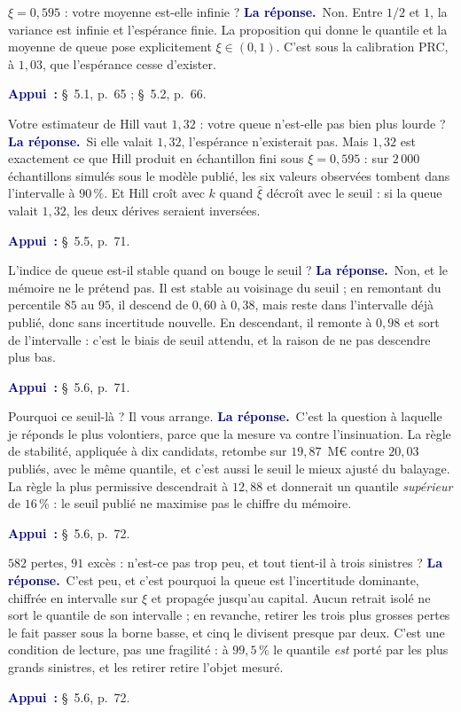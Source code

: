 \documentclass[11pt,a4paper]{article}
\newcommand{\rep}[1]{\smallskip\noindent\textcolor{navy}{\textbf{La réponse.}}\ #1\par}
\newcommand{\appui}[1]{\smallskip\noindent\small\textcolor{navy}{\textbf{Appui~:}} #1\par\normalsize}
\begin{document}
\begin{question}{\og $\xi=0{,}595$ : votre moyenne est-elle infinie ?\fg{}}
\rep{Non. Entre $1/2$ et $1$, la variance est infinie et l'espérance finie. La proposition qui
donne le quantile et la moyenne de queue pose explicitement $\xi\in(0,1)$. C'est sous la
calibration PRC, à $1{,}03$, que l'espérance cesse d'exister.}
\appui{\S~5.1, p.~65 ; \S~5.2, p.~66.}
\end{question}

\begin{question}{\og Votre estimateur de Hill vaut $1{,}32$ : votre queue n'est-elle pas bien plus lourde ?\fg{}}
\rep{Si elle valait $1{,}32$, l'espérance n'existerait pas. Mais $1{,}32$ est exactement ce que Hill
produit en échantillon fini sous $\xi=0{,}595$ : sur $2\,000$ échantillons simulés sous le modèle
publié, les six valeurs observées tombent dans l'intervalle à $90\,\%$. Et Hill croît avec $k$
quand $\hat\xi$ décroît avec le seuil : si la queue valait $1{,}32$, les deux dérives seraient
inversées.}
\appui{\S~5.5, p.~71.}
\end{question}

\begin{question}{\og L'indice de queue est-il stable quand on bouge le seuil ?\fg{}}
\rep{Non, et le mémoire ne le prétend pas. Il est stable au voisinage du seuil ; en remontant du
percentile $85$ au $95$, il descend de $0{,}60$ à $0{,}38$, mais reste dans l'intervalle déjà
publié, donc sans incertitude nouvelle. En descendant, il remonte à $0{,}98$ et sort de
l'intervalle : c'est le biais de seuil attendu, et la raison de ne pas descendre plus bas.}
\appui{\S~5.6, p.~71.}
\end{question}

\begin{question}{\og Pourquoi ce seuil-là ? Il vous arrange.\fg{}}
\rep{C'est la question à laquelle je réponds le plus volontiers, parce que la mesure va contre
l'insinuation. La règle de stabilité, appliquée à dix candidats, retombe sur $19{,}87$~M\euro{}
contre $20{,}03$ publiés, avec le même quantile, et c'est aussi le seuil le mieux ajusté du
balayage. La règle la plus permissive descendrait à $12{,}88$ et donnerait un quantile
\emph{supérieur} de $16\,\%$ : le seuil publié ne maximise pas le chiffre du mémoire.}
\appui{\S~5.6, p.~72.}
\end{question}

\begin{question}{\og $582$ pertes, $91$ excès : n'est-ce pas trop peu, et tout tient-il à trois sinistres ?\fg{}}
\rep{C'est peu, et c'est pourquoi la queue est l'incertitude dominante, chiffrée en intervalle sur
$\xi$ et propagée jusqu'au capital. Aucun retrait isolé ne sort le quantile de son intervalle ;
en revanche, retirer les trois plus grosses pertes le fait passer sous la borne basse, et cinq le
divisent presque par deux. C'est une condition de lecture, pas une fragilité : à $99{,}5\,\%$ le
quantile \emph{est} porté par les plus grands sinistres, et les retirer retire l'objet mesuré.}
\appui{\S~5.6, p.~72.}
\end{question}
\end{document}
